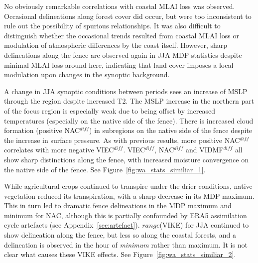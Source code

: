 No obviously remarkable correlations with coastal \ac{MLAI} loss was observed. Occasional delineations along forest cover did occur, but were too inconsistent to rule out the possibility of spurious relationships. It was also difficult to distinguish whether the occasional trends resulted from coastal \ac{MLAI} loss or modulation of atmospheric differences by the coast itself. However, sharp delineations along the fence are observed again in \ac{JJA} \ac{MDP} statistics despite minimal \ac{MLAI} loss around here, indicating that land cover imposes a local modulation upon changes in the synoptic background.

A change in \ac{JJA} synoptic conditions between periods sees an increase of \ac{MSLP} through the region despite increased \ac{T2}. The \ac{MSLP} increase in the northern part of the focus region is especially weak due to being offset by increased temperatures (especially on the native side of the fence). There is increased cloud formation (positive \ac{NAC}$^{diff}$) in subregions on the native side of the fence despite the increase in surface pressure. As with previous results, more positive \ac{NAC}$^{diff}$ correlates with more negative \ac{VIEC}$^{diff}$. \ac{VIEC}$^{diff}$, \ac{NAC}$^{diff}$ and \ac{VIDMF}$^{diff}$ all show sharp distinctions along the fence, with increased moisture convergence on the native side of the fence. See Figure~\ref{fig:wa_stats_similiar_1}.

While agricultural crops continued to transpire under the drier conditions, native vegetation reduced its transpiration, with a sharp decrease in its \ac{MDP} maximum. This in turn led to dramatic fence delineations in the \ac{MDP} maximum and minimum for \ac{NAC}, although this is partially confounded by \ac{ERA5} assimilation cycle artefacts (see Appendix~\ref{sec:artefact}). $range$(\ac{VIKE}) for \ac{JJA} continued to show delineation along the fence, but less so along the coastal forests, and a delineation is observed in the hour of \textit{minimum} rather than maximum. It is not clear what causes these \ac{VIKE} effects. See Figure~\ref{fig:wa_stats_similiar_2}.

